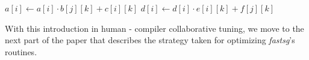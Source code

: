 \begin{algorithm}[h]
\small{
	\caption{}
 	\label{alg:example3}                       
 	\begin{algorithmic}[0]
					\State $a[i] \leftarrow a[i] \cdot b[j][k] + c[i][k]$
					\State $d[i] \leftarrow d[i] \cdot e[i][k] + f[j][k]$
				\EndFor
			\EndFor
    	\EndFor
 	\end{algorithmic}
}
\end{algorithm}

With this introduction in human - compiler collaborative tuning, we move to the
next part of the paper that describes the strategy taken for optimizing
\textit{fastsg}'s routines.
